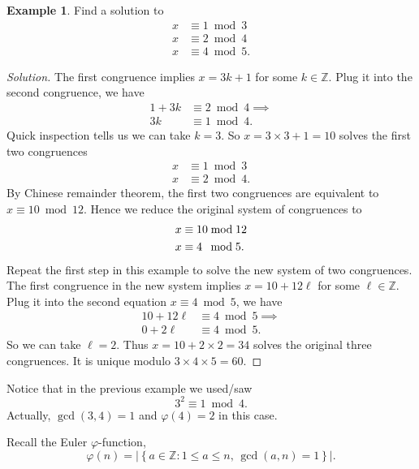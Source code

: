 \documentclass{amsbook}
\theoremstyle{plain}
\theoremstyle{definition}
\newtheorem{example}[theorem]{Example}
\theoremstyle{remark}
\numberwithin{equation}{chapter}
\numberwithin{figure}{chapter}
\newcommand{\Z}{\mathbb{Z}}
\begin{document}
\begin{example}
Find a solution to 
\begin{align}
  x &\equiv 1 \bmod 3 \\
  x &\equiv 2 \bmod 4 \\
  x &\equiv 4 \bmod 5.
\end{align}
\end{example}
\begin{proof}[Solution]
  The first congruence implies $x = 3k + 1$ for some $k \in \Z$. Plug it into the second congruence, we have
  \begin{align}
    1 + 3k &\equiv 2 \bmod 4 \implies \\
    3k &\equiv 1 \bmod 4.
  \end{align}
  Quick inspection tells us we can take $k = 3$. So $x = 3\times 3 + 1 = 10$ solves the first two congruences
  \begin{align}
    x &\equiv 1 \bmod 3 \\
    x &\equiv 2 \bmod 4.
  \end{align}
  By Chinese remainder theorem, the first two congruences are equivalent to $x \equiv 10 \bmod 12$. Hence we reduce the original system of congruences to
  \begin{align}
    x &\equiv 10 \bmod 12 \\
    x &\equiv 4 \hspace{1.7mm}\bmod 5.
  \end{align}
  Repeat the first step in this example to solve the new system of two congruences. The first congruence in the new system implies $x = 10 + 12 \ell$ for some $\ell \in \Z$. Plug it into the second equation $x \equiv 4 \bmod 5$, we have
  \begin{align}
    10 + 12 \ell &\equiv 4 \bmod 5 \implies \\
    0 + 2 \ell &\equiv 4 \bmod 5.
  \end{align}
  So we can take $\ell = 2$. Thus $x = 10 + 2\times 2 = 34$ solves the original three congruences. It is unique modulo $3\times 4 \times 5 = 60$. 
\end{proof}
Notice that in the previous example we used/saw
\[
  3^2 \equiv 1 \bmod 4.
\]
Actually, $\gcd (3, 4) = 1$ and $\varphi(4) = 2$ in this case.

Recall the Euler $\varphi$-function,
\[
  \varphi (n) = | \left\{ a \in \Z : 1 \leqslant a \leqslant n, \, \gcd (a, n) = 1 \right\} |.
\]
\end{document}
